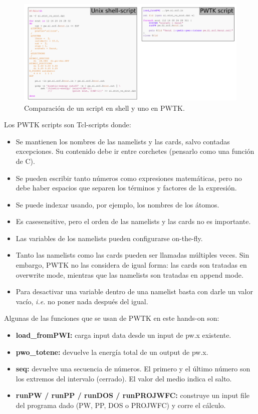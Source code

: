   \begin{figure}[H]
      \centering
      \includegraphics[scale = 0.4]{figs/D2/shellvspwtk.png}
      \caption{Comparación de un script en shell y uno en PWTK.}
  \end{figure}

  Los PWTK scripts son Tcl-scripts donde:
    \begin{itemize}
      \item Se mantienen los nombres de las namelists y las cards, salvo contadas excepciones. Su contenido debe ir entre corchetes (pensarlo como una función de C).
      \item Se pueden escribir tanto números como expresiones matemáticas, pero no debe haber espacios que separen los términos y factores de la expresión.
      \item Se puede indexar usando, por ejemplo, los nombres de los átomos.
      \item Es casesensitive, pero el orden de las namelists y las cards no es importante.
      \item Las variables de los namelists pueden configurarse on-the-fly.
      \item Tanto las namelists como las cards pueden ser llamadas múltiples veces. Sin embargo, PWTK no las considera de igual forma: las cards son tratadas en overwrite mode, mientras que las namelists son tratadas en append mode.
      \item Para desactivar una variable dentro de una namelist basta con darle un valor vacío, \emph{i.e.} no poner nada después del igual.
    \end{itemize}

    Algunas de las funciones que se usan de PWTK en este hands-on son:
      \begin{itemize}
        \item \textbf{load\_fromPWI:} carga input data desde un input de pw.x existente.
        \item \textbf{pwo\_totene:} devuelve la energía total de un output de pw.x.
        \item \textbf{seq:} devuelve una secuencia de números. El primero y el último número son los extremos del intervalo (cerrado). El valor del medio indica el salto.
        \item \textbf{runPW / runPP / runDOS / runPROJWFC:} construye un input file del programa dado (PW, PP, DOS o PROJWFC) y corre el cálculo.
      \end{itemize}

